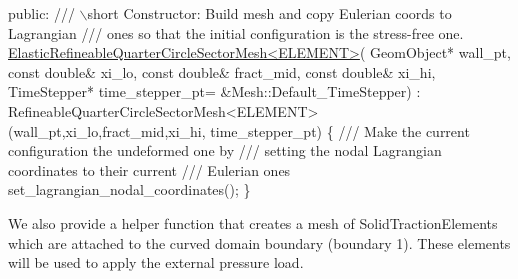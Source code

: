 \begin{DoxyCodeInclude}


\textcolor{keyword}{public}:
\textcolor{comment}{}
\textcolor{comment}{ /// \(\backslash\)short Constructor: Build mesh and copy Eulerian coords to Lagrangian}
\textcolor{comment}{ /// ones so that the initial configuration is the stress-free one.}
\textcolor{comment}{} \hyperlink{classElasticRefineableQuarterCircleSectorMesh}{ElasticRefineableQuarterCircleSectorMesh<ELEMENT>}(
      GeomObject* wall\_pt,
                                         \textcolor{keyword}{const} \textcolor{keywordtype}{double}& xi\_lo,
                                         \textcolor{keyword}{const} \textcolor{keywordtype}{double}& fract\_mid,
                                         \textcolor{keyword}{const} \textcolor{keywordtype}{double}& xi\_hi,
                                         TimeStepper* time\_stepper\_pt=
                                         &Mesh::Default\_TimeStepper) :
  RefineableQuarterCircleSectorMesh<ELEMENT>(wall\_pt,xi\_lo,fract\_mid,xi\_hi,
                                             time\_stepper\_pt)
  \{\textcolor{comment}{}
\textcolor{comment}{   /// Make the current configuration the undeformed one by}
\textcolor{comment}{   /// setting the nodal Lagrangian coordinates to their current}
\textcolor{comment}{   /// Eulerian ones}
\textcolor{comment}{}   set\_lagrangian\_nodal\_coordinates();
  \}

\end{DoxyCodeInclude}


We also provide a helper function that creates a mesh of {\ttfamily Solid\+Traction\+Elements} which are attached to the curved domain boundary (boundary 1). These elements will be used to apply the external pressure load.



